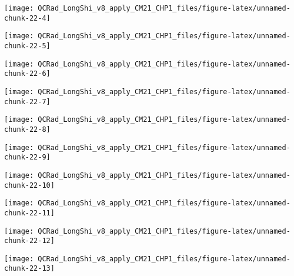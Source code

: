 \documentclass[
  10pt,
  a4paper,oneside]{article}
\begin{document}
\begin{center}\texttt{[image: QCRad\_LongShi\_v8\_apply\_CM21\_CHP1\_files/figure-latex/unnamed-chunk-22-4]} \end{center}

\begin{center}\texttt{[image: QCRad\_LongShi\_v8\_apply\_CM21\_CHP1\_files/figure-latex/unnamed-chunk-22-5]} \end{center}

\begin{center}\texttt{[image: QCRad\_LongShi\_v8\_apply\_CM21\_CHP1\_files/figure-latex/unnamed-chunk-22-6]} \end{center}

\begin{center}\texttt{[image: QCRad\_LongShi\_v8\_apply\_CM21\_CHP1\_files/figure-latex/unnamed-chunk-22-7]} \end{center}

\begin{center}\texttt{[image: QCRad\_LongShi\_v8\_apply\_CM21\_CHP1\_files/figure-latex/unnamed-chunk-22-8]} \end{center}

\begin{center}\texttt{[image: QCRad\_LongShi\_v8\_apply\_CM21\_CHP1\_files/figure-latex/unnamed-chunk-22-9]} \end{center}

\begin{center}\texttt{[image: QCRad\_LongShi\_v8\_apply\_CM21\_CHP1\_files/figure-latex/unnamed-chunk-22-10]} \end{center}

\begin{center}\texttt{[image: QCRad\_LongShi\_v8\_apply\_CM21\_CHP1\_files/figure-latex/unnamed-chunk-22-11]} \end{center}

\begin{center}\texttt{[image: QCRad\_LongShi\_v8\_apply\_CM21\_CHP1\_files/figure-latex/unnamed-chunk-22-12]} \end{center}

\begin{center}\texttt{[image: QCRad\_LongShi\_v8\_apply\_CM21\_CHP1\_files/figure-latex/unnamed-chunk-22-13]} \end{center}
\end{document}
